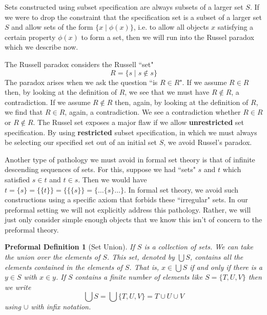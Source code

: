 \documentclass[oneside, 12pt]{book}
\theoremstyle{break}
\newtheorem{preformal definition}[definition]{Preformal Definition}
\newtheorem{preformal theorem}[theorem]{Preformal Theorem}
\newcommand{\qq}[1]{``#1"}
\begin{document}
			Sets constructed using subset specification are always subsets of a larger set $S$.
			If we were to drop the constraint that the specification set is a subset of a larger set $S$ and allow sets of the form $\{x \mid \phi(x)\}$, i.e. to allow all objects $x$ satisfying a certain property $\phi(x)$ to form a set, then we will run into the Russel paradox which we describe now.
			
			The Russell paradox considers the Russell \qq{set}
			\begin{equation*}
				R = \{s \mid s\not \in s\}
			\end{equation*}
			The paradox arises when we ask the question \qq{is $R\in R$}. 
			If we assume $R\in R$ then, by looking at the definition of $R$, we see that we must have $R\not \in R$, a contradiction.
			If we assume $R\not \in R$ then, again, by looking at the definition of $R$, we find that $R \in R$, again, a contradiction.
			We see a contradiction whether $R\in R$ or $R\not \in R$.
			The Russel set exposes a major flaw if we allow \textbf{unrestricted} set specification.
			By using \textbf{restricted} subset specification, in which we must always be selecting our specified set out of an initial set $S$, we avoid Russel's paradox.
			
			Another type of pathology we must avoid in formal set theory is that of infinite descending sequences of sets.
			For this, suppose we had \qq{sets} $s$ and $t$ which satisfied $s\in t$ and $t\in s$.
			Then we would have $t = \{s\} = \{\{t\}\} = \{\{\{s\}\} = \{\ldots \{s\}\ldots \}$.
			In formal set theory, we avoid such constructions using a specific axiom that forbids these \qq{irregular} sets.
			In our preformal setting we will not explicitly address this pathology.
			Rather, we will just only consider simple enough objects that we know this isn't of concern to the preformal theory.
			
			\begin{preformal definition}[Set Union]
				If $S$ is a collection of sets.
				We can take the union over the elements of $S$.
				This set, denoted by $\bigcup S$, contains all the elements contained in the elements of $S$.
				That is, $x \in \bigcup S$ if and only if there is a $y\in S$ with $x\in y$.
				If $S$ contains a finite number of elements like $S = \{T, U, V\}$ then we write
				$$
				\bigcup S = \bigcup \{T, U, V\} = T \cup U \cup V
				$$
				using $\cup$ with infix notation.
			\end{preformal definition}
			
\end{document}

